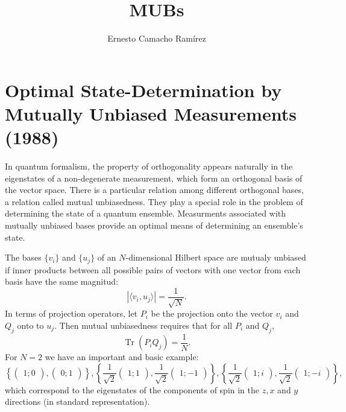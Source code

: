 \documentclass[a4paper]{article}
\title{MUBs}
\author{Ernesto Camacho Ramírez}
\DeclareMathOperator{\Tr}{Tr}
\begin{document}
  \maketitle

  \section{Optimal State-Determination by Mutually Unbiased
  Measurements (1988)}

  In quantum formalism, the property of orthogonality
  appears naturally in the eigenstates of a non-degenerate
  measurement, which form an orthogonal basis of the vector
  space. There is a particular relation among different
  orthogonal bases, a relation called mutual unbiasedness.
  They play a special role in the problem of determining the
  state of a quantum ensemble. Measurments associated with
  mutually unbiased bases provide an optimal means of
  determining an ensemble's state. 

  The bases $\{v_i\}$ and $\{u_j\}$ of an $N$-dimensional
  Hilbert space are mutualy unbiased if inner products
  between all possible pairs of vectors with one vector from
  each basis have the same magnitud:
  \[
    |\langle v_i, u_j \rangle|
    = \frac{1}{\sqrt{N}}.
  \] 
  In terms of projection operators, let $P_i$ be the
  projection onto the vector $v_i$ and $Q_j$ onto to $u_j$.
  Then mutual unbiasedness requires that for all $P_i$ and
  $Q_j$,
  \[
    \Tr(P_iQ_j) = \frac{1}{N}.
  \] 
  For $N = 2$ we have an important and basic example:
  \[
    \left\{
      \begin{pmatrix} 1; 0 \end{pmatrix},
      \begin{pmatrix} 0; 1 \end{pmatrix} 
    \right\},
    \left\{
      \frac{1}{\sqrt{2}} \begin{pmatrix} 1; 1 \end{pmatrix},
      \frac{1}{\sqrt{2}} \begin{pmatrix} 1; -1 \end{pmatrix} 
    \right\},
    \left\{
      \frac{1}{\sqrt{2}} \begin{pmatrix} 1; i \end{pmatrix},
      \frac{1}{\sqrt{2}} \begin{pmatrix} 1; -i \end{pmatrix} 
    \right\},
  \] 
  which correspond to the eigenstates of the components of
  spin in the $z, x$ and $y$ directions (in standard
  representation).
\end{document}
